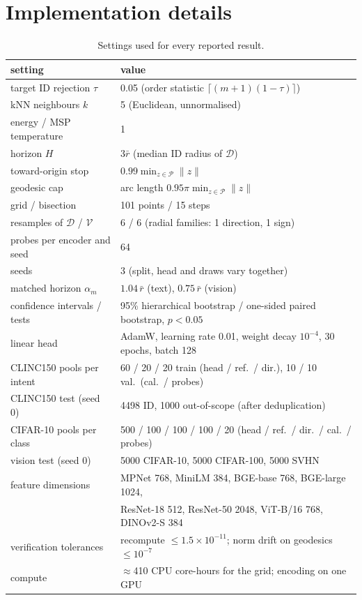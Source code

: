 \documentclass[11pt]{article}
\theoremstyle{definition}
\theoremstyle{remark}
\begin{document}
\section{Implementation details}\label{app:impl}
\begin{table}[!htbp]
\centering
\small
\caption{Settings used for every reported result.}
\label{tab:impl}
\begin{tabular}{ll}
\toprule
setting & value \\
\midrule
target ID rejection $\tau$ & 0.05 (order statistic $\lceil(m+1)(1-\tau)\rceil$) \\
kNN neighbours $k$ & 5 (Euclidean, unnormalised) \\
energy / MSP temperature & 1 \\
horizon $H$ & $3\bar r$ (median ID radius of $\mathcal{D}$) \\
toward-origin stop & $0.99\min_{z\in\mathcal{P}}\|z\|$ \\
geodesic cap & arc length $0.95\pi\min_{z\in\mathcal{P}}\|z\|$ \\
grid / bisection & 101 points / 15 steps \\
resamples of $\mathcal{D}$ / $\mathcal{V}$ & 6 / 6 (radial families: 1 direction, 1 sign) \\
probes per encoder and seed & 64 \\
seeds & 3 (split, head and draws vary together) \\
matched horizon $\alpha_m$ & $1.04\,\bar r$ (text), $0.75\,\bar r$ (vision) \\
confidence intervals / tests & 95\% hierarchical bootstrap / one-sided paired bootstrap, $p<0.05$ \\
linear head & AdamW, learning rate 0.01, weight decay $10^{-4}$, 30 epochs, batch 128 \\
CLINC150 pools per intent & 60 / 20 / 20 train (head / ref.\ / dir.), 10 / 10 val.\ (cal.\ / probes) \\
CLINC150 test (seed 0) & 4498 ID, 1000 out-of-scope (after deduplication) \\
CIFAR-10 pools per class & 500 / 100 / 100 / 100 / 20 (head / ref.\ / dir.\ / cal.\ / probes) \\
vision test (seed 0) & 5000 CIFAR-10, 5000 CIFAR-100, 5000 SVHN \\
feature dimensions & MPNet 768, MiniLM 384, BGE-base 768, BGE-large 1024, \\
 & ResNet-18 512, ResNet-50 2048, ViT-B/16 768, DINOv2-S 384 \\
verification tolerances & recompute $\le1.5\times10^{-11}$; norm drift on geodesics $\le10^{-7}$ \\
compute & $\approx$410 CPU core-hours for the grid; encoding on one GPU \\
\bottomrule
\end{tabular}
\end{table}
\end{document}
